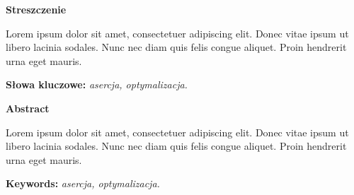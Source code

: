 \begin{center}
	\textbf{Streszczenie}
\end{center}

Lorem ipsum dolor sit amet, consectetuer adipiscing elit. Donec vitae ipsum ut
libero lacinia sodales. Nunc nec diam quis felis congue aliquet. Proin hendrerit
urna eget mauris.

\vspace*{\baselineskip}

\noindent\textbf{Słowa kluczowe:} \textit{asercja, optymalizacja.}

\vspace*{2\baselineskip}

\begin{center}
	\textbf{Abstract}
\end{center}

Lorem ipsum dolor sit amet, consectetuer adipiscing elit. Donec vitae ipsum ut
libero lacinia sodales. Nunc nec diam quis felis congue aliquet. Proin hendrerit
urna eget mauris.

\vspace*{\baselineskip}

\noindent\textbf{Keywords:} \textit{asercja, optymalizacja.}

\setcounter{page}{2}
